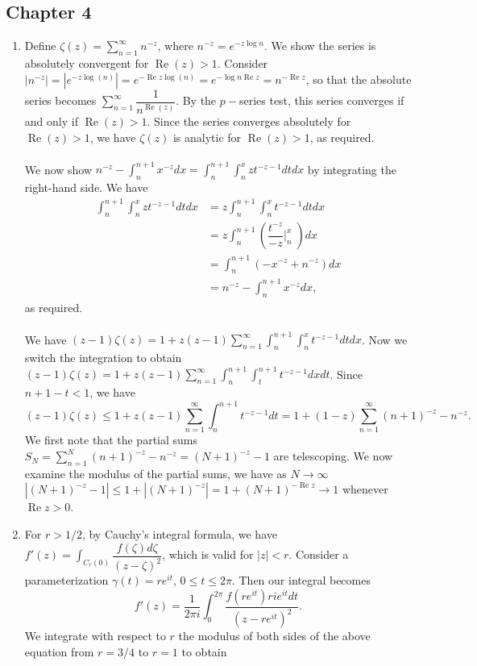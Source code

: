 \documentclass[11pt]{book}
\theoremstyle{definition}
\renewcommand{\Re}{\operatorname{Re}}
\begin{document}
\subsection{Chapter 4}
\begin{enumerate}
%
%
\item Define $\zeta(z)=\sum_{n=1}^\infty n^{-z}$, where $n^{-z}=e^{-z\log{n}}$. We show the series is absolutely convergent for $\Re(z)>1$. Consider $|n^{-z}|=|e^{-z\log(n)}|=e^{-\Re{z\log(n)}}=e^{-\log{n}\Re{z}}=n^{-\Re{z}}$, so that the absolute series becomes $\sum_{n=1}^\infty \dfrac{1}{n^{\Re(z)}}$. By the $p-$series test, this series converges if and only if $\Re(z)>1$. Since the series converges absolutely for $\Re(z)>1$, we have $\zeta(z)$ is analytic for $\Re(z)>1$, as required.
\\ \\
We now show $n^{-z}-\int_n^{n+1} x^{-z}dx = \int_n^{n+1}\int_n^x zt^{-z-1}dtdx$ by integrating the right-hand side. We have
\begin{align*}
\int_n^{n+1}\int_n^x zt^{-z-1}dtdx &= z\int_n^{n+1}\int_n^x t^{-z-1}dtdx \\
&=z\int_n^{n+1}\left(\dfrac{t^{-z}}{-z}\bigg|_n^x\;\right)dx \\
&= \int_n^{n+1} (-x^{-z} + n^{-z}) dx \\
&= n^{-z} - \int_n^{n+1} x^{-z}dx,
\end{align*}
as required.
\\ \\
We have $(z-1)\zeta(z) = 1+z(z-1)\sum_{n=1}^\infty \int_n^{n+1}\int_n^xt^{-z-1}dtdx$. Now we switch the integration to obtain $(z-1)\zeta(z)=1+z(z-1)\sum_{n=1}^\infty \int_n^{n+1}\int_t^{n+1} t^{-z-1}dxdt$. Since $n+1-t<1$, we have
\[
(z-1)\zeta(z) \leq 1 + z(z-1) \sum_{n=1}^\infty \int_n^{n+1}t^{-z-1}dt = 1+(1-z)\sum_{n=1}^\infty (n+1)^{-z}-n^{-z}.
\]
We first note that the partial sums $S_N= \sum_{n=1}^N (n+1)^{-z}-n^{-z} = (N+1)^{-z}-1$ are telescoping. We now examine the modulus of the partial sums, we have as $N\to \infty$ $|(N+1)^{-z}-1|\leq 1+|(N+1)^{-z}| = 1+(N+1)^{-\Re{z}}\to 1$ whenever $\Re{z}>0$. 
%
%
\item For $r>1/2$, by Cauchy's integral formula, we have $f'(z)=\int_{C_r(0)} \dfrac{f(\zeta)d\zeta}{(z-\zeta)^2}$, which is valid for $|z|<r$. Consider a parameterization $\gamma(t) = re^{it}$, $0\leq t\leq 2\pi$. Then our integral becomes
\[
f'(z) = \dfrac{1}{2\pi i}\int_0^{2\pi} \dfrac{f(re^{it})rie^{it}dt}{(z-re^{it})^2}.
\]
We integrate with respect to $r$ the modulus of both sides of the above equation from $r=3/4$ to $r=1$ to obtain

\end{enumerate}
\end{document}

